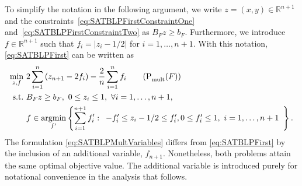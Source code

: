 \documentclass[runningheads,orivec]{llncs}
\newcommand{\MacroColor}[1]{#1}
\DeclareMathOperator*{\Argmin}{\MacroColor{argmin}}
\newcommand{\NVariables}{\MacroColor{n}}
\newcommand{\SATBooleanFormula}{\MacroColor{F}}
\newcommand{\ReformZ}{\MacroColor{z}}
\newcommand{\ReformAugFrac}{\MacroColor{f}}
\begin{document}
To simplify the notation in the following argument, we write $\ReformZ = (x, y) \in \mathbb{R}^{\NVariables + 1}$ and the constraints~\eqref{eq:SATBLPFirstConstraintOne} and~\eqref{eq:SATBLPFirstConstraintTwo} as $B_{\SATBooleanFormula} \ReformZ \ge b_{\SATBooleanFormula}$.
Furthermore, we introduce $\ReformAugFrac \in \mathbb{R}^{\NVariables + 1}$ such that $\ReformAugFrac_i = |\ReformZ_i - 1/2|$ for $i = 1, \ldots, \NVariables + 1$.
With this notation, \eqref{eq:SATBLPFirst} can be written as
\begin{align}
\min_{\ReformZ, \ReformAugFrac} \ & 2 \sum_{i = 1}^{n} \left(\ReformZ_{\NVariables + 1} - 2 \ReformAugFrac_i \right) - \frac{2}{n} \sum_{i = 1}^{\NVariables} \ReformAugFrac_i
\tag{P${}_{\text{mult}}^{\text{}}(\SATBooleanFormula)$}
\label{eq:SATBLPMultVariables}
\\
\text{s.t.} \ &
B_{\SATBooleanFormula} \ReformZ \ge b_{\SATBooleanFormula}, \
0 \le \ReformZ_i \le 1, \
\forall i = 1, \ldots, \NVariables + 1, 
\notag 
\\
&
\ReformAugFrac \in \Argmin_{\ReformAugFrac'} 
\left\{ 
\sum_{i = 1}^{\NVariables + 1} \ReformAugFrac_i'
:
\begin{array}{l}
-\ReformAugFrac_i' \le z_i - 1/2 \le \ReformAugFrac_i', 0 \le \ReformAugFrac_i' \le 1, \ i = 1, \ldots, \NVariables + 1
\end{array}
\right\}. \notag 
\end{align}
The formulation \eqref{eq:SATBLPMultVariables} differs from \eqref{eq:SATBLPFirst} by the inclusion of an additional variable, $\ReformAugFrac_{\NVariables + 1}$.  
Nonetheless, both problems attain the same optimal objective value.  
The additional variable is introduced purely for notational convenience in the analysis that follows.
\end{document}
